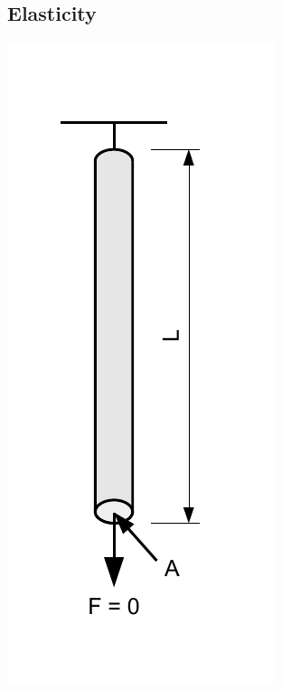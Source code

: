 \subsection{Elasticity}
\begin{minipage}{3cm}
	\includegraphics[scale=0.6]{images/elasticity_robe.pdf}
\end{minipage}
\hfill
